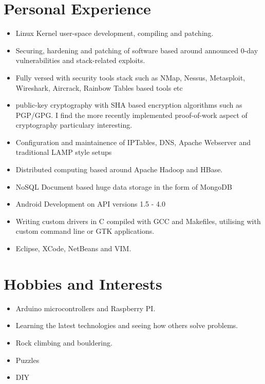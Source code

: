 \documentclass[a4paper,10pt]{moderncv}
\begin{document}
\section{Personal Experience}
\begin{itemize}
\item Linux Kernel user-space development, compiling and patching.
\item Securing, hardening and patching of software based around announced 0-day vulnerabilities and stack-related exploits.
\item Fully versed with security tools stack such as NMap, Nessus, Metasploit, Wireshark, Aircrack, Rainbow Tables based tools etc
\item public-key cryptography with SHA based encryption algorithms such as PGP/GPG. I find the more recently implemented proof-of-work aspect of cryptography particulary interesting.
\item Configuration and maintainence of IPTables, DNS, Apache Webserver and traditional LAMP style setups
\item Distributed computing based around Apache Hadoop and HBase.
\item NoSQL Document based huge data storage in the form of MongoDB
\item Android Development on API versions 1.5 - 4.0
\item Writing custom drivers in C compiled with GCC and Makefiles, utilising with custom command line or GTK applications.
\item Eclipse, XCode, NetBeans and VIM.
\end{itemize}

\section{Hobbies and Interests}
\begin{itemize}
\item Arduino microcontrollers and Raspberry PI.
\item Learning the latest technologies and seeing how others solve problems.
\item Rock climbing and bouldering.
\item Puzzles
\item DIY
\end{itemize}
\end{document}
